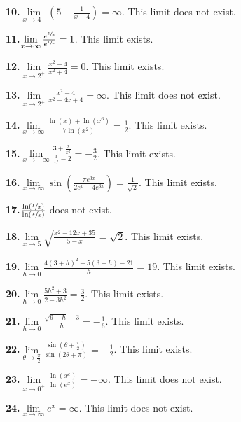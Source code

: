 \documentclass[12pt,]{book}
\theoremstyle{plain}
\theoremstyle{definition}
\theoremstyle{definition}
\theoremstyle{definition}
\theoremstyle{definition}
\theoremstyle{definition}
\numberwithin{equation}{section}
\newcommand{\fe}[2]{#1\mathopen{}\left(#2\right)\mathclose{}}
\begin{document}
\noindent\textbf{10.}\quad{}\(\lim\limits_{x\to4^{-}}\left(5-\frac{1}{x-4}\right)=\infty\). This limit does not exist.%
\par\smallskip
\noindent\textbf{11.}\quad{}\(\lim\limits_{x\to\infty}\frac{e^{\sfrac{2}{x}}}{e^{\sfrac{1}{x}}}=1\). This limit exists.%
\par\smallskip
\noindent\textbf{12.}\quad{}\(\lim\limits_{x\to2^{+}}\frac{x^2-4}{x^2+4}=0\). This limit exists.%
\par\smallskip
\noindent\textbf{13.}\quad{}\(\lim\limits_{x\to2^{+}}\frac{x^2-4}{x^2-4x+4}=\infty\). This limit does not exist.%
\par\smallskip
\noindent\textbf{14.}\quad{}\(\lim\limits_{x\to\infty}\frac{\fe{\ln}{x}+\fe{\ln}{x^6}}{7\fe{\ln}{x^2}}=\frac{1}{2}\). This limit exists.%
\par\smallskip
\noindent\textbf{15.}\quad{}\(\lim\limits_{x\to-\infty}\frac{3+\frac{2}{x^2}}{\frac{3}{x^2}-2}=-\frac{3}{2}\). This limit exists.%
\par\smallskip
\noindent\textbf{16.}\quad{}\(\lim\limits_{x\to\infty}\fe{\sin}{\frac{\pi e^{3x}}{2e^x+4e^{3x}}}=\frac{1}{\sqrt{2}}\). This limit exists.%
\par\smallskip
\noindent\textbf{17.}\quad{}\(\frac{\fe{\ln}{\sfrac{1}{x}}}{\fe{\ln}{\sfrac{x}{x}}}\) does not exist.%
\par\smallskip
\noindent\textbf{18.}\quad{}\(\lim\limits_{x\to5}\sqrt{\frac{x^2-12x+35}{5-x}}=\sqrt{2}\). This limit exists.%
\par\smallskip
\noindent\textbf{19.}\quad{}\(\lim\limits_{h\to0}\frac{4(3+h)^2-5(3+h)-21}{h}=19\). This limit exists.%
\par\smallskip
\noindent\textbf{20.}\quad{}\(\lim\limits_{h\to0}\frac{5h^2+3}{2-3h^2}=\frac{3}{2}\). This limit exists.%
\par\smallskip
\noindent\textbf{21.}\quad{}\(\lim\limits_{h\to0}\frac{\sqrt{9-h}-3}{h}=-\frac{1}{6}\). This limit exists.%
\par\smallskip
\noindent\textbf{22.}\quad{}\(\lim\limits_{\theta\to\frac{\pi}{2}}\frac{\fe{\sin}{\theta+\frac{\pi}{2}}}{\fe{\sin}{2\theta+\pi}}=-\frac{1}{2}\). This limit exists.%
\par\smallskip
\noindent\textbf{23.}\quad{}\(\lim\limits_{x\to0^{+}}\frac{\fe{\ln}{x^e}}{\fe{\ln}{e^x}}=-\infty\). This limit does not exist.%
\par\smallskip
\noindent\textbf{24.}\quad{}\(\lim\limits_{x\to\infty}e^x=\infty\). This limit does not exist.%
\par\smallskip
\end{document}
